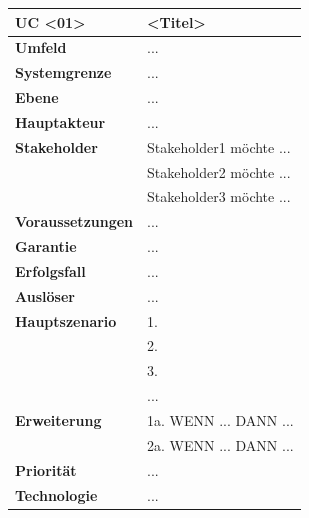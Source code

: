 \begin{tabularx}{\linewidth}{|p{3.5cm}|X|}
	\hline
	\textbf{UC <01>}		& \textbf{<Titel>} \\ \hline
	\textbf{Umfeld}			& ... \\ \hline
	\textbf{Systemgrenze}	& ... \\ \hline
	\textbf{Ebene}			& ... \\ \hline
	\textbf{Hauptakteur}	& ... \\ \hline
	\textbf{Stakeholder}
        & Stakeholder1 möchte ...  \\
        & Stakeholder2 möchte ... \\
        & Stakeholder3 möchte ... \\
        \hline
	\textbf{Voraussetzungen}   & ... \\ \hline
	\textbf{Garantie}          & ... \\ \hline
	\textbf{Erfolgsfall}       & ... \\ \hline
	\textbf{Auslöser}          & ... \\ \hline	
	\textbf{Hauptszenario}			
        & 1. \\
	    & 2. \\
		& 3. \\
		& ... \\
        \hline
	\textbf{Erweiterung}			
        & 1a. WENN ... DANN ... \\ 
		& 2a. WENN ... DANN ... \\
        \hline
	\textbf{Priorität}     & ... \\ \hline
	\textbf{Technologie}   & ... \\ \hline
\end{tabularx}
